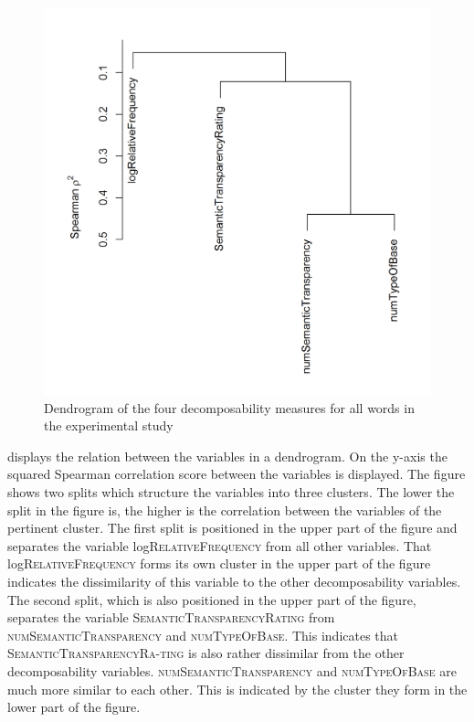  \begin{figure} [b!]
 	\centering
 	\includegraphics[scale=0.5]{images/Experiment/clusterAnalysisDecomposabilityExperimentAllTokens.png}
 	\caption{ Dendrogram of the four decomposability measures for all words in the experimental study}
 	\label{fig:cluster experiment all affixes}
 \end{figure}
 
 displays the relation between the variables in a dendrogram. On the y-axis the squared Spearman correlation score between the variables is displayed. 
The figure shows two splits which structure the variables into three clusters. The lower the split in the figure is, the higher is the correlation between the variables of the pertinent cluster.
The first split is positioned in the upper part of the figure and separates the  variable log\textsc{RelativeFrequency} from all other variables. That log\textsc{RelativeFrequency} forms its own cluster in the upper part of the figure indicates the dissimilarity of this variable to the other decomposability variables. 
The second split, which is also positioned in the upper part of the figure, separates the variable \textsc{SemanticTransparencyRating} from \textsc{numSemanticTransparency} and \textsc{numTypeOfBase}. This indicates that \textsc{SemanticTransparencyRa-ting} is also rather dissimilar from the other decomposability variables. 
\textsc{numSemanticTransparency} and \textsc{numTypeOfBase} are much more similar to each other. This is indicated by the cluster they form in the lower part of the figure. 

